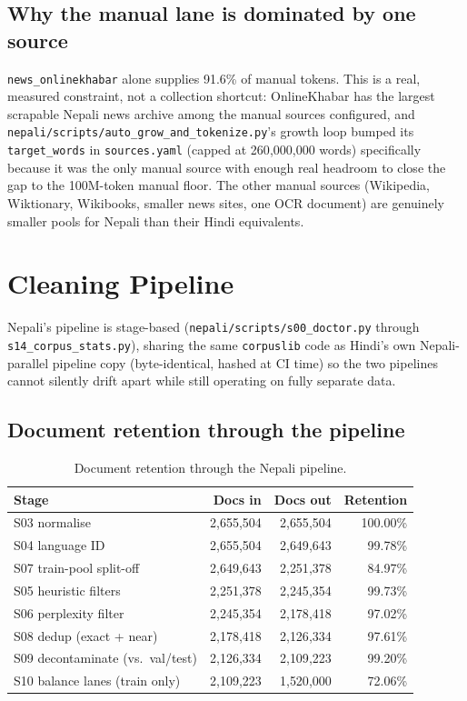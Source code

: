 \documentclass[11pt]{article}
\begin{document}
\subsection*{Why the manual lane is dominated by one source}

\texttt{news\_onlinekhabar} alone supplies 91.6\% of manual tokens. This is
a real, measured constraint, not a collection shortcut: OnlineKhabar has
the largest scrapable Nepali news archive among the manual sources
configured, and \texttt{nepali/scripts/auto\_grow\_and\_tokenize.py}'s
growth loop bumped its \texttt{target\_words} in \texttt{sources.yaml}
(capped at 260{,}000{,}000 words) specifically because it was the only
manual source with enough real headroom to close the gap to the 100M-token
manual floor. The other manual sources (Wikipedia, Wiktionary, Wikibooks,
smaller news sites, one OCR document) are genuinely smaller pools for
Nepali than their Hindi equivalents.

\section{Cleaning Pipeline}

Nepali's pipeline is stage-based (\texttt{nepali/scripts/s00\_doctor.py}
through \texttt{s14\_corpus\_stats.py}), sharing the same
\texttt{corpuslib} code as Hindi's own Nepali-parallel pipeline copy
(byte-identical, hashed at CI time) so the two pipelines cannot silently
drift apart while still operating on fully separate data.

\subsection*{Document retention through the pipeline}

\begin{table}[htbp]
\centering
\begin{tabular}{lrrr}
\toprule
Stage & Docs in & Docs out & Retention \\
\midrule
S03 normalise & 2{,}655{,}504 & 2{,}655{,}504 & 100.00\% \\
S04 language ID & 2{,}655{,}504 & 2{,}649{,}643 & 99.78\% \\
S07 train-pool split-off & 2{,}649{,}643 & 2{,}251{,}378 & 84.97\% \\
S05 heuristic filters & 2{,}251{,}378 & 2{,}245{,}354 & 99.73\% \\
S06 perplexity filter & 2{,}245{,}354 & 2{,}178{,}418 & 97.02\% \\
S08 dedup (exact + near) & 2{,}178{,}418 & 2{,}126{,}334 & 97.61\% \\
S09 decontaminate (vs.\ val/test) & 2{,}126{,}334 & 2{,}109{,}223 & 99.20\% \\
S10 balance lanes (train only) & 2{,}109{,}223 & 1{,}520{,}000 & 72.06\% \\
\bottomrule
\end{tabular}
\caption{Document retention through the Nepali pipeline.}
\end{table}
\end{document}
